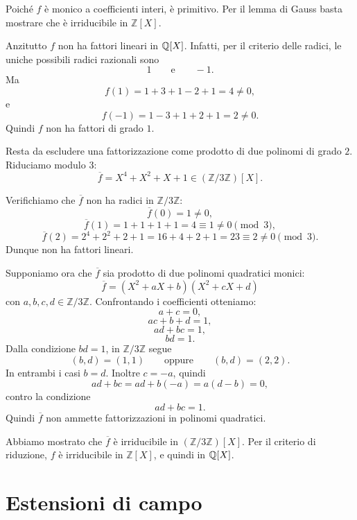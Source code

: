 \documentclass[a4paper]{article}
\begin{document}
\begin{snippetproof}{}
    Poiché \(f\) è monico a coefficienti interi, è primitivo.
    Per il lemma di Gauss basta mostrare che è irriducibile in \(\mathbb{Z}[X]\).

    Anzitutto \(f\) non ha fattori lineari in \(\mathbb{Q}[X]\).
    Infatti, per il criterio delle radici, le uniche possibili radici razionali sono
    \[
        1
        \qquad
        \text{e}
        \qquad
        -1.
    \]
    Ma
    \[
        f(1)=1+3+1-2+1=4\neq 0,
    \]
    e
    \[
        f(-1)=1-3+1+2+1=2\neq 0.
    \]
    Quindi \(f\) non ha fattori di grado \(1\).

    Resta da escludere una fattorizzazione come prodotto di due polinomi di grado \(2\).
    Riduciamo modulo \(3\):
    \[
        \overline{f}
        =
        X^4+X^2+X+1
        \in(\mathbb{Z}/3\mathbb{Z})[X].
    \]

    Verifichiamo che \(\overline{f}\) non ha radici in \(\mathbb{Z}/3\mathbb{Z}\):
    \[
        \overline{f}(0)=1\neq 0,
    \]
    \[
        \overline{f}(1)=1+1+1+1=4\equiv 1\neq 0 \pmod 3,
    \]
    \[
        \overline{f}(2)=2^4+2^2+2+1=16+4+2+1=23\equiv 2\neq 0 \pmod 3.
    \]
    Dunque non ha fattori lineari.

    Supponiamo ora che \(\overline{f}\) sia prodotto di due polinomi quadratici monici:
    \[
        \overline{f}
        =
        (X^2+aX+b)(X^2+cX+d)
    \]
    con \(a,b,c,d\in\mathbb{Z}/3\mathbb{Z}\).
    Confrontando i coefficienti otteniamo:
    \[
        a+c=0,
    \]
    \[
        ac+b+d=1,
    \]
    \[
        ad+bc=1,
    \]
    \[
        bd=1.
    \]
    Dalla condizione \(bd=1\), in \(\mathbb{Z}/3\mathbb{Z}\) segue
    \[
        (b,d)=(1,1)
        \qquad
        \text{oppure}
        \qquad
        (b,d)=(2,2).
    \]
    In entrambi i casi \(b=d\). Inoltre \(c=-a\), quindi
    \[
        ad+bc
        =
        a d+b(-a)
        =
        a(d-b)
        =
        0,
    \]
    contro la condizione
    \[
        ad+bc=1.
    \]
    Quindi \(\overline{f}\) non ammette fattorizzazioni in polinomi quadratici.

    Abbiamo mostrato che \(\overline{f}\) è irriducibile in \((\mathbb{Z}/3\mathbb{Z})[X]\). Per il criterio di riduzione, \(f\) è irriducibile in \(\mathbb{Z}[X]\), e quindi in \(\mathbb{Q}[X]\).
\end{snippetproof}

\pagebreak

\section{Estensioni di campo}
\end{document}
